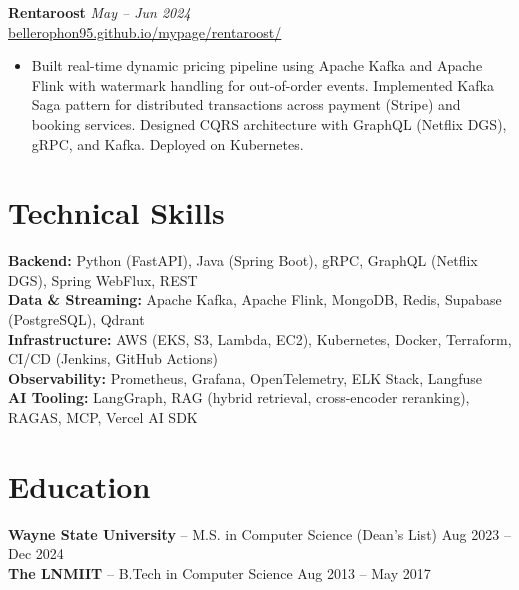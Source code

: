 \documentclass[10pt,letterpaper]{article}
\newcommand{\project}[3]{%
  \vspace{3pt}
  \noindent\textbf{#1} \hfill \textit{#2} \\
  {\small #3}
  \vspace{1pt}
}
\begin{document}
\project{Rentaroost}{May -- Jun 2024}{\href{https://bellerophon95.github.io/mypage/rentaroost/}{bellerophon95.github.io/mypage/rentaroost/}}
\begin{itemize}
  \item Built real-time dynamic pricing pipeline using Apache Kafka and Apache Flink with watermark handling for out-of-order events. Implemented Kafka Saga pattern for distributed transactions across payment (Stripe) and booking services. Designed CQRS architecture with GraphQL (Netflix DGS), gRPC, and Kafka. Deployed on Kubernetes.
\end{itemize}

\section{Technical Skills}

\noindent\textbf{Backend:} Python (FastAPI), Java (Spring Boot), gRPC, GraphQL (Netflix DGS), Spring WebFlux, REST \\
\textbf{Data \& Streaming:} Apache Kafka, Apache Flink, MongoDB, Redis, Supabase (PostgreSQL), Qdrant \\
\textbf{Infrastructure:} AWS (EKS, S3, Lambda, EC2), Kubernetes, Docker, Terraform, CI/CD (Jenkins, GitHub Actions) \\
\textbf{Observability:} Prometheus, Grafana, OpenTelemetry, ELK Stack, Langfuse \\
\textbf{AI Tooling:} LangGraph, RAG (hybrid retrieval, cross-encoder reranking), RAGAS, MCP, Vercel AI SDK

\section{Education}

\noindent\textbf{Wayne State University} -- M.S. in Computer Science (Dean's List) \hfill Aug 2023 -- Dec 2024 \\
\textbf{The LNMIIT} -- B.Tech in Computer Science \hfill Aug 2013 -- May 2017
\end{document}
